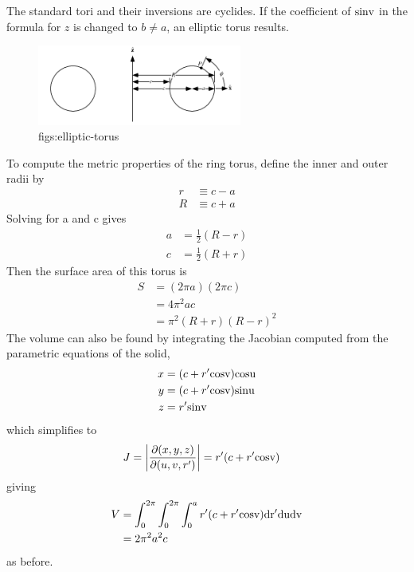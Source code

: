 \documentclass[lang=en,11pt,a4paper,cite=numbers]{elegantpaper}
\begin{document}
  The standard tori and their inversions are cyclides. If the coefficient of $\rm{sin}v$ in the formula for $z$ is changed to $b{\neq}a$, an elliptic torus results.
\begin{figure}[!htb]
  \centering
  \includegraphics[width=0.6\textwidth]{figs/elliptic-torus.png}
  \caption{figs:elliptic-torus}
  \label{figs:elliptic-torus}
\end{figure}
To compute the metric properties of the ring torus, define the inner and outer radii by
\begin{equation}
  \begin{aligned}
    r&{\equiv}c-a\\
    R&{\equiv}c+a
  \end{aligned}
\end{equation}
Solving for a and c gives
\begin{equation}
  \begin{aligned}
    a&=\frac{1}{2}(R-r)\\
    c&=\frac{1}{2}(R+r)
  \end{aligned}
\end{equation}
Then the surface area of this torus is
\begin{equation}
  \begin{aligned}
    S&=(2{\pi}a)(2{\pi}c)\\
     &=4{\pi}^{2}ac\\
     &={\pi}^{2}(R+r)(R-r)^{2}
  \end{aligned}
\end{equation}
The volume can also be found by integrating the Jacobian computed from the parametric equations of the solid,
\begin{equation}
  \begin{aligned}
    x&=(c+r'\rm{cos}v)\rm{cos}u\\
    y&=(c+r'\rm{cos}v)\rm{sin}u\\
    z&=r'\rm{sin}v
  \end{aligned}
\end{equation}
which simplifies to
\begin{equation}
  \begin{aligned}
    J&=\left|\frac{{\partial}(x,y,z)}{{\partial}(u,v,r')}\right|=r'(c+r'\rm{cos}v)
  \end{aligned}
\end{equation}
giving
\begin{equation}
  \begin{aligned}
    V&=\int^{2\pi}_{0}\int^{2\pi}_{0}\int^{a}_{0}r'(c+r'\rm{cos}v)dr'dudv\\
     &=2{\pi}^{2}a^{2}c
  \end{aligned}
\end{equation}
as before.
\end{document}
